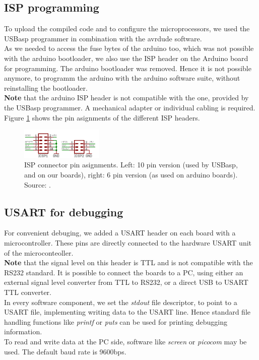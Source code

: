 \documentclass[a4paper]{scrreprt}
\begin{document}
\subsection{ISP programming}\label{chap:isp}
To upload the compiled code and to configure the microprocessors, we used the USBasp programmer in combination with the avrdude software.\\
As we needed to access the fuse bytes of the arduino too, which was not possible with the arduino bootloader, we also use the ISP header on the Arduino board for programming. The arduino bootloader was removed. Hence it is not possible anymore, to programm the arduino with the arduino software suite, without reinstalling the bootloader.\\
\textbf{Note} that the arduino ISP header is not compatible with the one, provided by the USBasp programmer. A mechanical adapter or individual cabling is required. 
Figure \ref{fig:isp} shows the pin asignments of the different ISP headers.
\begin{figure}[htbp]
	\centering
	\includegraphics[width=0.35\textwidth]{img/isp.png}
  \caption{ISP connector pin asignments. Left: 10 pin version (used by USBasp, and on our boards), right: 6 pin version (as used on arduino boards). Source: \cite{micronet}.}
	\label{fig:isp}
\end{figure}
\subsection{USART for debugging}
For convenient debuging, we added a USART header on each board with a microcontroller. 
These pins are directly connected to the hardware USART unit of the microconteoller.\\ 
\textbf{Note} that the signal level on this header is TTL and is not compatible with the RS232 standard. It is possible to connect the boards to a PC, using either an external signal level converter from TTL to RS232, or a direct USB to USART TTL converter.\\
In every software component, we set the \emph{stdout} file descriptor, to point to a USART file, implementing writing data to the USART line.
Hence standard file handling functions like \emph{printf} or \emph{puts} can be used for printing debugging information.\\
To read and write data at the PC side, software like \emph{screen} or \emph{picocom} may be used. The default baud rate is 9600bps.
\end{document}
